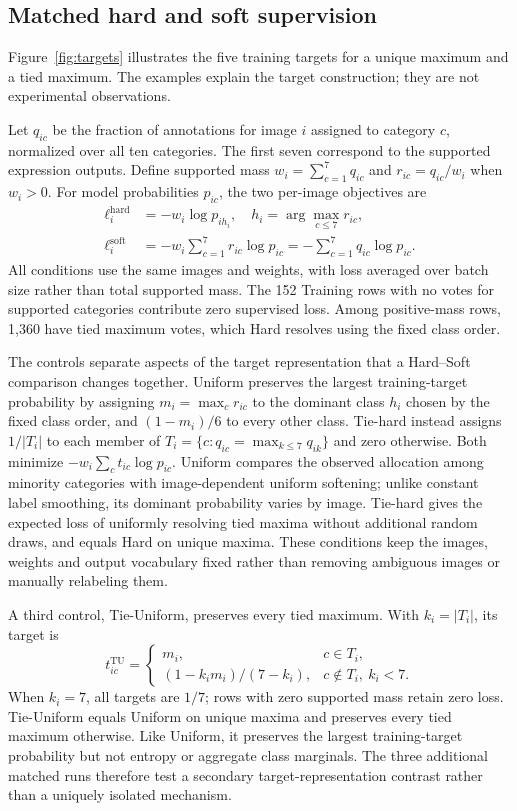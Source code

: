 \documentclass[pdflatex,sn-mathphys-num]{sn-jnl}
\begin{document}
\subsection{Matched hard and soft supervision}
Figure~\ref{fig:targets} illustrates the five training targets for a unique maximum and a tied maximum. The examples explain the target construction; they are not experimental observations.
\begin{samepage}
Let $q_{ic}$ be the fraction of annotations for image $i$ assigned to category $c$, normalized over all ten categories. The first seven correspond to the supported expression outputs. Define supported mass $w_i=\sum_{c=1}^{7}q_{ic}$ and $r_{ic}=q_{ic}/w_i$ when $w_i>0$. For model probabilities $p_{ic}$, the two per-image objectives are
\begin{align}
\ell_i^{\mathrm{hard}}&=-w_i\log p_{i h_i},\quad h_i=\arg\max_{c\leq7}r_{ic},\\
\ell_i^{\mathrm{soft}}&=-w_i\sum_{c=1}^{7}r_{ic}\log p_{ic}
                     =-\sum_{c=1}^{7}q_{ic}\log p_{ic}.
\end{align}
All conditions use the same images and weights, with loss averaged over batch size rather than total supported mass. The 152 Training rows with no votes for supported categories contribute zero supervised loss. Among positive-mass rows, 1,360 have tied maximum votes, which Hard resolves using the fixed class order.
\end{samepage}

The controls separate aspects of the target representation that a Hard--Soft comparison changes together. Uniform preserves the largest training-target probability by assigning $m_i=\max_c r_{ic}$ to the dominant class $h_i$ chosen by the fixed class order, and $(1-m_i)/6$ to every other class. Tie-hard instead assigns $1/|T_i|$ to each member of $T_i=\{c:q_{ic}=\max_{k\leq7}q_{ik}\}$ and zero otherwise. Both minimize $-w_i\sum_c t_{ic}\log p_{ic}$. Uniform compares the observed allocation among minority categories with image-dependent uniform softening; unlike constant label smoothing, its dominant probability varies by image. Tie-hard gives the expected loss of uniformly resolving tied maxima without additional random draws, and equals Hard on unique maxima. These conditions keep the images, weights and output vocabulary fixed rather than removing ambiguous images or manually relabeling them.

A third control, Tie-Uniform, preserves every tied maximum. With $k_i=|T_i|$, its target is
\begin{equation}
t_{ic}^{\mathrm{TU}}=\begin{cases}m_i,&c\in T_i,\\(1-k_i m_i)/(7-k_i),&c\notin T_i,\ k_i<7.\end{cases}
\end{equation}
When $k_i=7$, all targets are $1/7$; rows with zero supported mass retain zero loss. Tie-Uniform equals Uniform on unique maxima and preserves every tied maximum otherwise. Like Uniform, it preserves the largest training-target probability but not entropy or aggregate class marginals. The three additional matched runs therefore test a secondary target-representation contrast rather than a uniquely isolated mechanism.
\end{document}
